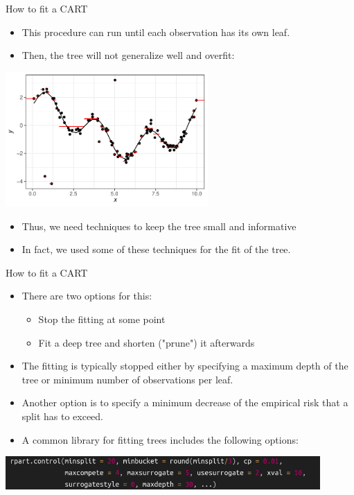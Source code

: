 \documentclass[11pt,compress,t,notes=noshow, xcolor=table]{beamer}
\begin{document}
\begin{vbframe}{How to fit a CART}
\begin{itemize}
\item This procedure can run until each observation has its own leaf.
\item Then, the tree will not generalize well and overfit:
\end{itemize}

{\centering \includegraphics[width=0.58\textwidth]{figure/tree-overfitting-prediction.pdf} 

}

\begin{itemize}
\item Thus, we need techniques to keep the tree small and informative
\item In fact, we used some of these techniques for the fit of the tree.
\end{itemize}

\end{vbframe}
\begin{vbframe}{How to fit a CART}
\begin{itemize}
\item There are two options for this:
\begin{itemize}
\item Stop the fitting at some point
\item Fit a deep tree and shorten ("prune") it afterwards
\end{itemize}
\item The fitting is typically stopped either by specifying a maximum depth of the tree or minimum number of observations per leaf.
\item Another option is to specify a minimum decrease of the empirical risk that a split has to exceed.
\item A common library for fitting trees includes the following options:
\end{itemize}

{\centering \includegraphics[width=0.9\textwidth]{figure_man/rpart.control-options.png} 

}

\end{vbframe} 
\end{document}
